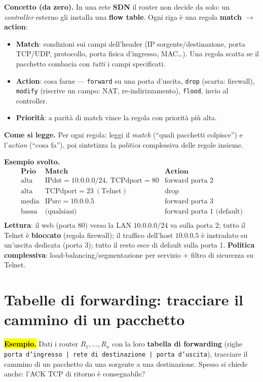 \documentclass[11pt,a4paper]{report}
\begin{document}
\textbf{Concetto (da zero).} In una rete \textbf{SDN} il router non decide da
solo: un \emph{controller} esterno gli installa una \textbf{flow table}. Ogni
riga è una regola \textbf{match $\to$ action}:
\begin{itemize}[noitemsep]
\item \textbf{Match}: condizioni sui campi dell'header (IP sorgente/destinazione,
porta TCP/UDP, protocollo, porta fisica d'ingresso, MAC\dots). Una regola scatta
se il pacchetto combacia con \emph{tutti} i campi specificati.
\item \textbf{Action}: cosa farne --- \texttt{forward} su una porta d'uscita,
\texttt{drop} (scarta: firewall), \texttt{modify} (riscrive un campo: NAT,
re-indirizzamento), \texttt{flood}, invio al controller.
\item \textbf{Priorità}: a parità di match vince la regola con priorità più alta.
\end{itemize}

\textbf{Come si legge.} Per ogni regola: leggi il \emph{match} (``quali pacchetti
colpisce'') e l'\emph{action} (``cosa fa''), poi sintetizza la \emph{politica}
complessiva delle regole insieme.

\textbf{Esempio svolto.}
\[
\begin{array}{c|l|l}
\textbf{Prio} & \textbf{Match} & \textbf{Action} \\ \hline
\text{alta} & \text{IPdst}=10.0.0.0/24,\ \text{TCPdport}=80 & \text{forward porta 2} \\
\text{alta} & \text{TCPdport}=23\ (\text{Telnet}) & \text{drop} \\
\text{media} & \text{IPsrc}=10.0.0.5 & \text{forward porta 3} \\
\text{bassa} & \text{(qualsiasi)} & \text{forward porta 1 (default)} \\
\end{array}
\]
\textbf{Lettura}: il web (porta 80) verso la LAN $10.0.0.0/24$ va sulla porta 2;
tutto il Telnet è \textbf{bloccato} (regola firewall); il traffico dell'host
$10.0.0.5$ è instradato su un'uscita dedicata (porta 3); tutto il resto esce di
default sulla porta 1. \textbf{Politica complessiva}: load-balancing/segmentazione
per servizio $+$ filtro di sicurezza su Telnet.

\section{Tabelle di forwarding: tracciare il cammino di un pacchetto}
\label{teoria:forwarding}
\hl{\textbf{Esempio.}} Dati i router $R_1,\dots,R_n$ con la loro \textbf{tabella di
forwarding} (righe \texttt{porta d'ingresso | rete di destinazione | porta
d'uscita}), tracciare il cammino di un pacchetto da una sorgente a una
destinazione. Spesso si chiede anche: l'ACK TCP di ritorno è consegnabile?
\end{document}
